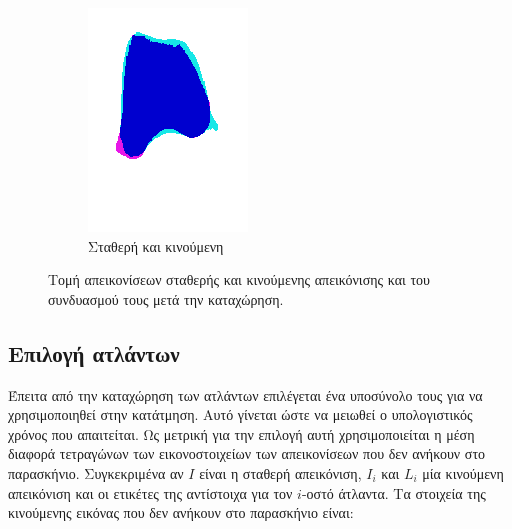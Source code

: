 \documentclass[a4paper,12pt]{article}
\begin{document}
\begin{figure}[H]
    \begin{subfigure}[t]{0.4\linewidth}
    \includegraphics[width=\linewidth]{combination_label_after_registration_3.png}
    \caption{Σταθερή και κινούμενη}
    \end{subfigure}

    \caption{Τομή απεικονίσεων σταθερής και κινούμενης απεικόνισης και του
             συνδυασμού τους μετά την καταχώρηση.}
    \label{fig:registration_after:3}
\end{figure}


\subsection{Επιλογή ατλάντων}

Έπειτα από την καταχώρηση των ατλάντων επιλέγεται ένα υποσύνολο τους για να
χρησιμοποιηθεί στην κατάτμηση. Αυτό γίνεται ώστε να μειωθεί ο υπολογιστικός
χρόνος που απαιτείται. Ως μετρική για την επιλογή αυτή χρησιμοποιείται η μέση
διαφορά τετραγώνων των εικονοστοιχείων των απεικονίσεων που δεν ανήκουν στο
παρασκήνιο.  Συγκεκριμένα αν $I$ είναι η σταθερή απεικόνιση, $I_i$ και $L_i$ μία
κινούμενη απεικόνιση και οι ετικέτες της αντίστοιχα για τον $i$-οστό άτλαντα. Τα
στοιχεία της κινούμενης εικόνας που δεν ανήκουν στο παρασκήνιο είναι:
\end{document}
